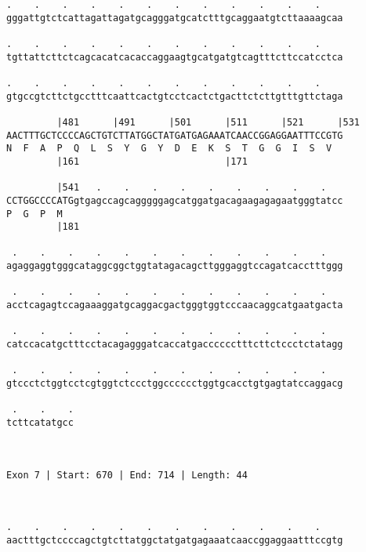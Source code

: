 \documentclass{article}
\begin{document}
\begin{Verbatim}
.    .    .    .    .    .    .    .    .    .    .    .    
gggattgtctcattagattagatgcagggatgcatctttgcaggaatgtcttaaaagcaa
                                                            
.    .    .    .    .    .    .    .    .    .    .    .    
tgttattcttctcagcacatcacaccaggaagtgcatgatgtcagtttcttccatcctca
                                                            
.    .    .    .    .    .    .    .    .    .    .    .    
gtgccgtcttctgcctttcaattcactgtcctcactctgacttctcttgtttgttctaga
                                                            
         |481      |491      |501      |511      |521      |531
AACTTTGCTCCCCAGCTGTCTTATGGCTATGATGAGAAATCAACCGGAGGAATTTCCGTG
N  F  A  P  Q  L  S  Y  G  Y  D  E  K  S  T  G  G  I  S  V  
         |161                          |171                 
  
         |541   .    .    .    .    .    .    .    .    .   
CCTGGCCCCATGgtgagccagcagggggagcatggatgacagaagagagaatgggtatcc
P  G  P  M                                                  
         |181                                               
  
 .    .    .    .    .    .    .    .    .    .    .    .   
agaggaggtgggcataggcggctggtatagacagcttgggaggtccagatcacctttggg
                                                            
 .    .    .    .    .    .    .    .    .    .    .    .   
acctcagagtccagaaaggatgcaggacgactgggtggtcccaacaggcatgaatgacta
                                                            
 .    .    .    .    .    .    .    .    .    .    .    .   
catccacatgctttcctacagagggatcaccatgacccccctttcttctccctctatagg
                                                            
 .    .    .    .    .    .    .    .    .    .    .    .   
gtccctctggtcctcgtggtctccctggcccccctggtgcacctgtgagtatccaggacg
                                                            
 .    .    .
tcttcatatgcc
            
            
 
Exon 7 | Start: 670 | End: 714 | Length: 44



.    .    .    .    .    .    .    .    .    .    .    .    
aactttgctccccagctgtcttatggctatgatgagaaatcaaccggaggaatttccgtg
                                                            

\end{Verbatim}
\end{document}

